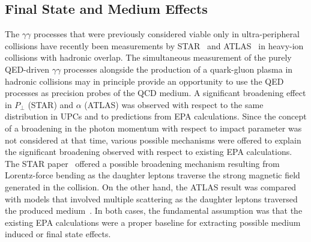 \documentclass[12pt,epjc3]{svjour3}\sloppy
\begin{document}
\subsection{Final State and Medium Effects}
The $\gamma\gamma$ processes that were previously considered viable only in ultra-peripheral collisions have recently been measurements by STAR~\cite{starcollaborationProductionEnsuremathPairs2004} and ATLAS~\cite{atlascollaborationObservationCentralitydependentAcoplanarity2018} in heavy-ion collisions with hadronic overlap. 
The simultaneous measurement of the purely QED-driven $\gamma\gamma$ processes alongside the production of a quark-gluon plasma in hadronic collisions may in principle provide an opportunity to use the QED processes as precision probes of the QCD medium.
A significant broadening effect in $P_\perp$ (STAR) and $\alpha$ (ATLAS) was observed with respect to the same distribution in UPCs and to predictions from EPA calculations.
Since the concept of a broadening in the photon momentum with respect to impact parameter was not considered at that time, various possible mechanisms were offered to explain the significant broadening observed with respect to existing EPA calculations.
The STAR paper~\cite{starcollaborationProductionEnsuremathPairs2004} offered a possible broadening mechanism resulting from Lorentz-force bending as the daughter leptons traverse the strong magnetic field generated in the collision.
On the other hand, the ATLAS result was compared with models that involved multiple scattering as the daughter leptons traversed the produced medium~\cite{atlascollaborationObservationCentralityDependentAcoplanarity2018a}.
In both cases, the fundamental assumption was that the existing EPA calculations were a proper baseline for extracting possible medium induced or final state effects.
\end{document}
